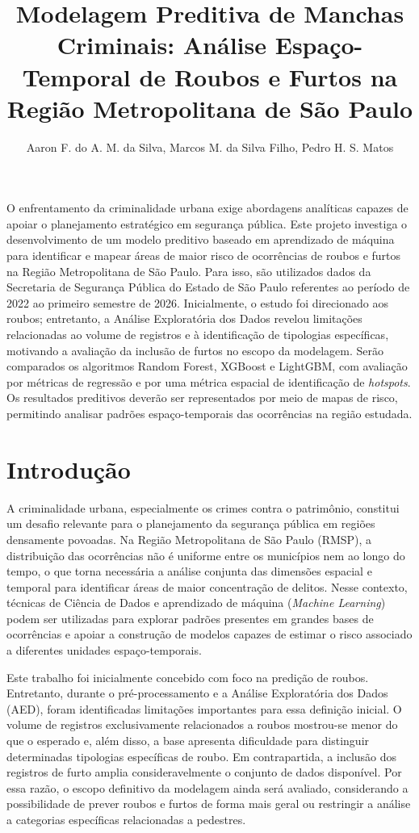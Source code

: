 \documentclass[12pt]{article}
\title{Modelagem Preditiva de Manchas Criminais: Análise Espaço-Temporal de Roubos e Furtos na Região Metropolitana de São Paulo}
\author{Aaron F. do A. M. da Silva\inst{1}, Marcos M. da Silva Filho\inst{2}, Pedro H. S. Matos\inst{3}}
\begin{document}
\maketitle

\begin{resumo}
O enfrentamento da criminalidade urbana exige abordagens analíticas capazes de apoiar o planejamento estratégico em segurança pública. Este projeto investiga o desenvolvimento de um modelo preditivo baseado em aprendizado de máquina para identificar e mapear áreas de maior risco de ocorrências de roubos e furtos na Região Metropolitana de São Paulo. Para isso, são utilizados dados da Secretaria de Segurança Pública do Estado de São Paulo referentes ao período de 2022 ao primeiro semestre de 2026. Inicialmente, o estudo foi direcionado aos roubos; entretanto, a Análise Exploratória dos Dados revelou limitações relacionadas ao volume de registros e à identificação de tipologias específicas, motivando a avaliação da inclusão de furtos no escopo da modelagem. Serão comparados os algoritmos Random Forest, XGBoost e LightGBM, com avaliação por métricas de regressão e por uma métrica espacial de identificação de \textit{hotspots}. Os resultados preditivos deverão ser representados por meio de mapas de risco, permitindo analisar padrões espaço-temporais das ocorrências na região estudada.
\end{resumo}

\vspace{0.5cm}

\section{Introdução}

A criminalidade urbana, especialmente os crimes contra o patrimônio, constitui um desafio relevante para o planejamento da segurança pública em regiões densamente povoadas. Na Região Metropolitana de São Paulo (RMSP), a distribuição das ocorrências não é uniforme entre os municípios nem ao longo do tempo, o que torna necessária a análise conjunta das dimensões espacial e temporal para identificar áreas de maior concentração de delitos. Nesse contexto, técnicas de Ciência de Dados e aprendizado de máquina (\textit{Machine Learning}) podem ser utilizadas para explorar padrões presentes em grandes bases de ocorrências e apoiar a construção de modelos capazes de estimar o risco associado a diferentes unidades espaço-temporais.

Este trabalho foi inicialmente concebido com foco na predição de roubos. Entretanto, durante o pré-processamento e a Análise Exploratória dos Dados (AED), foram identificadas limitações importantes para essa definição inicial. O volume de registros exclusivamente relacionados a roubos mostrou-se menor do que o esperado e, além disso, a base apresenta dificuldade para distinguir determinadas tipologias específicas de roubo. Em contrapartida, a inclusão dos registros de furto amplia consideravelmente o conjunto de dados disponível. Por essa razão, o escopo definitivo da modelagem ainda será avaliado, considerando a possibilidade de prever roubos e furtos de forma mais geral ou restringir a análise a categorias específicas relacionadas a pedestres.
\end{document}
